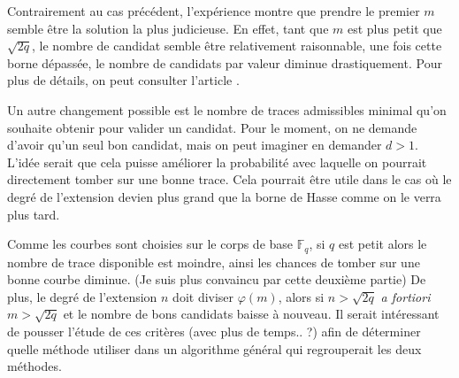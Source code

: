 \documentclass[a4paper]{article} %
\numberwithin{section}{part}
\numberwithin{equation}{section}
\newcommand\GF[1]{\mathbb{F}_{#1}}
\begin{document}
\begin{rem}
Contrairement au cas précédent, l'expérience montre que prendre le premier $m$ 
semble être la solution la plus judicieuse. En effet, tant que $m$ est plus 
petit que $\sqrt{2q}$, le nombre de candidat semble être relativement 
raisonnable, une fois cette borne dépassée, le nombre de candidats par valeur 
diminue drastiquement. Pour plus de détails, on peut consulter l'article 
\cite{CasHen}.\par
Un autre changement possible est le nombre de traces admissibles minimal qu'on
souhaite obtenir pour valider un candidat. Pour le moment, on ne demande d'avoir
qu'un seul bon candidat, mais on peut imaginer en demander $d>1$. 
L'idée serait que cela puisse améliorer la probabilité avec laquelle on pourrait
directement tomber sur une bonne trace. Cela pourrait être utile dans le cas où
le degré de l'extension devien plus grand que la borne de Hasse comme on le
verra plus tard.\par
Comme les courbes sont choisies sur le corps de base $\GF{q}$, si $q$ est petit
alors le nombre de trace disponible est moindre, ainsi les chances de tomber sur
une bonne courbe diminue. (Je suis plus convaincu par cette deuxième partie) 
De plus, le degré de l'extension $n$ doit diviser $\varphi(m)$, alors si $n > 
\sqrt{2q}$ \emph{a fortiori} $m >\sqrt{2q}$ et le nombre de bons candidats 
baisse à nouveau. Il serait intéressant de pousser l'étude de ces critères 
(avec plus de temps.. ?) afin de déterminer quelle méthode utiliser dans un 
algorithme général qui regrouperait les deux méthodes.
\end{rem}
\end{document}
